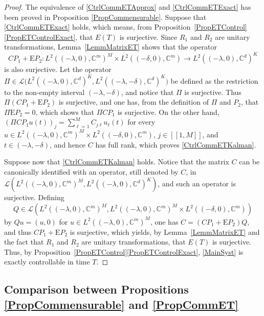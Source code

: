 \documentclass[10pt]{amsart}
\newcommand{\llbracket}{[\![}
\newcommand{\rrbracket}{]\!]}
\theoremstyle{plain}
\theoremstyle{definition}
\newcommand{\Epsilon}{\mathrm E}
\begin{document}
\begin{proof}
The equivalence of \eqref{CtrlCommETApprox} and \eqref{CtrlCommETExact} has been proved in Proposition \ref{PropCommensurable}. Suppose that \eqref{CtrlCommETExact} holds, which means, from Proposition~\ref{PropETControl}\eqref{PropETControlExact}, that $E(T)$ is surjective. Since $R_1$ and $R_2$ are unitary transformations, Lemma~\ref{LemmMatrixET} shows that the operator
\[
C P_1 + \Epsilon P_2: L^2((-\lambda, 0), \mathbb C^m)^M \times L^2((-\delta, 0), \mathbb C^m) \to L^2((-\lambda, 0), \mathbb C^d)^K
\]
is also surjective. Let the operator $\Pi \in \mathcal L\bigl(L^2((-\lambda, 0), \mathbb C^d)^K, L^2((-\lambda, -\delta), \mathbb C^d)^K\bigr)$ be defined as the restriction to the non-empty interval $(-\lambda, -\delta)$, and notice that $\Pi$ is surjective. Thus $\Pi(C P_1 + \Epsilon P_2)$ is surjective, and one has, from the definition of $\Pi$ and $P_2$, that $\Pi \Epsilon P_2 = 0$, which shows that $\Pi C P_1$ is surjective. On the other hand, $(\Pi C P_1 u(t))_j = \sum_{\ell=1}^M C_{j\ell} u_\ell(t)$ for every $u \in L^2((-\lambda, 0), \mathbb C^m)^M \times L^2((-\delta, 0), \mathbb C^m)$, $j \in \llbracket 1, M\rrbracket$, and $t \in (-\lambda, -\delta)$, and hence $C$ has full rank, which proves \eqref{CtrlCommETKalman}.

Suppose now that \eqref{CtrlCommETKalman} holds. Notice that the matrix $C$ can be canonically identified with an operator, still denoted by $C$, in $\mathcal L\left(L^2((-\lambda, 0), \mathbb C^m)^M, L^2((-\lambda, 0), \mathbb C^d)^K\right)$, and such an operator is surjective. Defining
\[
Q \in \mathcal L(L^2((-\lambda, 0), \mathbb C^m)^M, L^2((-\lambda, 0), \mathbb C^m)^M \times L^2((-\delta, 0), \mathbb C^m))
\]
by $Q u = (u, 0)$ for $u \in L^2((-\lambda, 0), \mathbb C^m)^M$, one has $C = (C P_1 + \Epsilon P_2) Q$, and thus $C P_1 + \Epsilon P_2$ is surjective, which yields, by Lemma~\ref{LemmMatrixET} and the fact that $R_1$ and $R_2$ are unitary transformations, that $E(T)$ is surjective. Thus, by Proposition~\ref{PropETControl}\eqref{PropETControlExact}, \eqref{MainSyst} is exactly controllable in time $T$.
\end{proof}

\subsection{Comparison between Propositions \ref{PropCommensurable} and \ref{PropCommET}}
\end{document}
